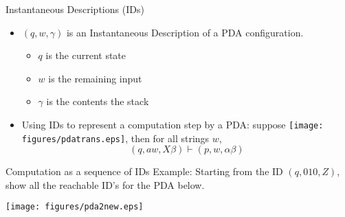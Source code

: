 \documentclass{prosper}%
\newcommand{\cvd}{\mbox{$\;\overset{*}{\vdash}\;$}}
\begin{document}
\begin{slide}{Instantaneous Descriptions (IDs)}
\begin{itemize}
\item $(q, w, \gamma)$ is an {\blue Instantaneous Description}  of a PDA  configuration.
\begin{itemize}
\item $q$ is the current state
\item $w$ is the remaining input
\item $\gamma$ is the contents the stack
\end{itemize}
\item Using IDs to represent a {\blue computation step by a PDA}: suppose  \texttt{[image: figures/pdatrans.eps]}, then for all strings $w$, \[(q, aw, X\beta)\vdash (p, w, \alpha \beta)\]


\end{itemize}
\end{slide}

\begin{slide}{Computation as a sequence of IDs}
Example: Starting from the ID $(q, 010, Z)$, show all the reachable ID's for the PDA below.
\begin{center}
\texttt{[image: figures/pda2new.eps]}
\end{center}
\end{slide}

\begin{comment}
\begin{slide}{Some properties of PDA}\label{sl:prop}
\begin{itemize}
\item If an ID sequence is a legal computation for a PDA, then so is the sequence obtained by adding an additional string to the second and/or third component. Formally: $\forall w \in\Sigma^*, \beta \in\Gamma^*$ :
\[
\mbox{if }(q, x, \mbox{\red \underline{$\alpha$}})\cvd(p, y, \mbox{\red \underline{$\beta$}}) \mbox{, then }(q, xw, \mbox{\red \underline{$\alpha\gamma$}} )\cvd(p, yw, \mbox{\red\underline{ $\beta\gamma$}})
\]
\item  If an ID sequence is a legal computation 
for a PDA, and some tail of the input is 
not consumed, then removing this tail from 
all ID's result in a legal computation sequence. 
\[
\mbox{if }(q, {\red\underline{ xw}}, \alpha)\cvd(p, {\red\underline{ yw}}, \beta)  \mbox{, then }(q, {\red \underline{x}}, \alpha )\cvd(p, {\red \underline{y}}, \beta)
\]
\end{itemize}
\end{slide}
\end{comment}
\end{document}
